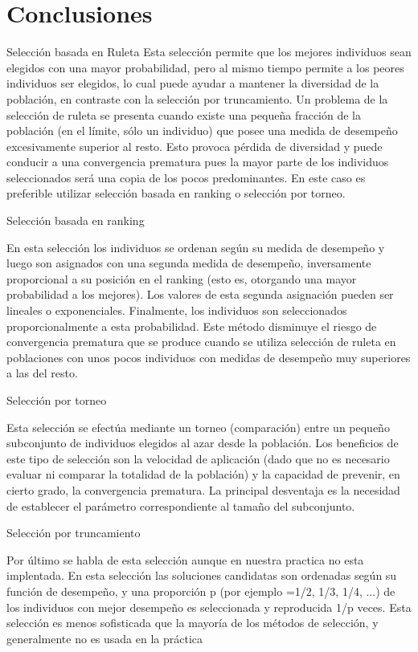 \documentclass[12pt]{article}
\begin{document}
\section{Conclusiones}
Selección basada en Ruleta
Esta selección permite que los mejores individuos sean elegidos con una mayor probabilidad, pero al mismo tiempo permite a los peores individuos ser elegidos, lo cual puede ayudar a mantener la diversidad de la población, en contraste con la selección por truncamiento.
Un problema de la selección de ruleta se presenta cuando existe una pequeña fracción de la población (en el límite, sólo un individuo) que posee una medida de desempeño excesivamente superior al resto. Esto provoca pérdida de diversidad y puede conducir a una convergencia prematura pues la mayor parte de los individuos seleccionados será una copia de los pocos predominantes. En este caso es preferible utilizar selección basada en ranking o selección por torneo.


Selección basada en ranking

En esta selección los individuos se ordenan según su medida de desempeño y luego son asignados con una segunda medida de desempeño, inversamente proporcional a su posición en el ranking (esto es, otorgando una mayor probabilidad a los mejores). Los valores de esta segunda asignación pueden ser lineales o exponenciales. Finalmente, los individuos son seleccionados proporcionalmente a esta probabilidad.
Este método disminuye el riesgo de convergencia prematura que se produce cuando se utiliza selección de ruleta en poblaciones con unos pocos individuos con medidas de desempeño muy superiores a las del resto.


Selección por torneo

Esta selección se efectúa mediante un torneo (comparación) entre un pequeño subconjunto de individuos elegidos al azar desde la población.
Los beneficios de este tipo de selección son la velocidad de aplicación (dado que no es necesario evaluar ni comparar la totalidad de la población) y la capacidad de prevenir, en cierto grado, la convergencia prematura. La principal desventaja es la necesidad de establecer el parámetro correspondiente al tamaño del subconjunto.	 

Selección por truncamiento

Por último se habla de esta selección aunque en nuestra practica no esta implentada. En esta selección las soluciones candidatas son ordenadas según su función de desempeño, y una proporción p (por ejemplo =1/2, 1/3, 1/4, ...) de los individuos con mejor desempeño es seleccionada y reproducida 1/p veces. Esta selección es menos sofisticada que la mayoría de los métodos de selección, y generalmente no es usada en la práctica
\end{document}

